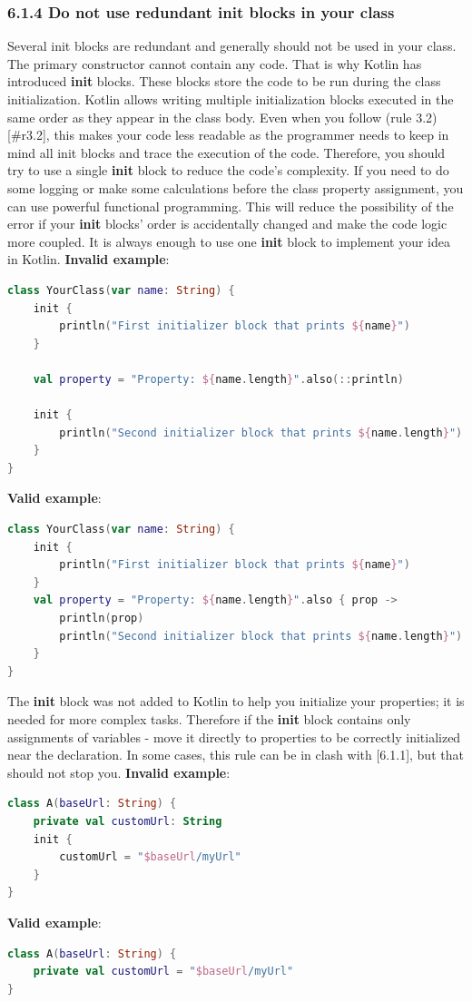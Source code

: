 \subsubsection*{\textbf{6.1.4 Do not use redundant init blocks in your class}}
\leavevmode\newline
\label{sec:6.1.4}
Several init blocks are redundant and generally should not be used in your class. The primary constructor cannot contain any code. That is why Kotlin has introduced \textbf{init} blocks.
These blocks store the code to be run during the class initialization.
Kotlin allows writing multiple initialization blocks executed in the same order as they appear in the class body.
Even when you follow (rule 3.2)[\#r3.2], this makes your code less readable as the programmer needs to keep in mind all init blocks and trace the execution of the code.
Therefore, you should try to use a single \textbf{init} block to reduce the code's complexity. If you need to do some logging or make some calculations before the class property assignment, you can use powerful functional programming. This will reduce the possibility of the error if your \textbf{init} blocks' order is accidentally changed and
make the code logic more coupled. It is always enough to use one \textbf{init} block to implement your idea in Kotlin.
\textbf{Invalid example}:
\begin{lstlisting}[language=Kotlin]
class YourClass(var name: String) {    
    init {
        println("First initializer block that prints ${name}")
    }
    
    val property = "Property: ${name.length}".also(::println)
    
    init {
        println("Second initializer block that prints ${name.length}")
    }
}
\end{lstlisting}
\textbf{Valid example}:
\begin{lstlisting}[language=Kotlin]
class YourClass(var name: String) {
    init {
        println("First initializer block that prints ${name}")
    }
    val property = "Property: ${name.length}".also { prop ->
        println(prop)
        println("Second initializer block that prints ${name.length}")
    }
}
\end{lstlisting}
The \textbf{init} block was not added to Kotlin to help you initialize your properties; it is needed for more complex tasks. 
Therefore if the \textbf{init} block contains only assignments of variables - move it directly to properties to be correctly initialized near the declaration.
In some cases, this rule can be in clash with [6.1.1], but that should not stop you.
\textbf{Invalid example}:
\begin{lstlisting}[language=Kotlin]
class A(baseUrl: String) {
    private val customUrl: String
    init {
        customUrl = "$baseUrl/myUrl"
    }
}
\end{lstlisting}
\textbf{Valid example}:
\begin{lstlisting}[language=Kotlin]
class A(baseUrl: String) {
    private val customUrl = "$baseUrl/myUrl"
}
\end{lstlisting}
